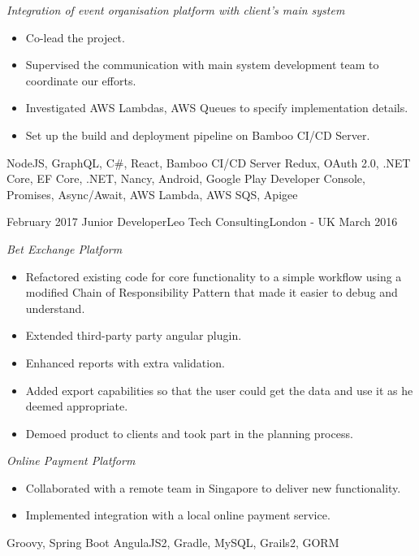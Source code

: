 \begin{experiences}
{        \emph{Integration of event organisation platform with client's main system}
        \begin{itemize}
          \item Co-lead the project.
          \item Supervised the communication with main system development team to coordinate our efforts.
          \item Investigated AWS Lambdas, AWS Queues to specify implementation details.
          \item Set up the build and deployment pipeline on Bamboo CI/CD Server.
        \end{itemize}
      }
      {NodeJS, GraphQL, C\#, React, Bamboo CI/CD Server}
      {Redux, OAuth 2.0, .NET Core, EF Core, .NET, Nancy, Android, Google Play Developer Console, Promises, Async/Await, AWS Lambda, AWS SQS, Apigee}
    \emptySeparator

    \experience
      {February 2017}
      {Junior Developer}{Leo Tech Consulting}{London - UK}
      {March 2016}
      {
        \emph{Bet Exchange Platform}
        \begin{itemize}
          \item Refactored existing code for core functionality to a simple workflow using a modified Chain of Responsibility Pattern that made it easier to debug and understand.
          \item Extended third-party party angular plugin.
          \item Enhanced reports with extra validation.
          \item Added export capabilities so that the user could get the data and use it as he deemed appropriate.
          \item Demoed product to clients and took part in the planning process.
        \end{itemize}

        \emph{Online Payment Platform}
        \begin{itemize}
          \item Collaborated with a remote team in Singapore to deliver new functionality.
          \item Implemented integration with a local online payment service.
        \end{itemize}
      }
      {Groovy, Spring Boot}
      {AngulaJS2, Gradle, MySQL, Grails2, GORM}
    \emptySeparator


\end{experiences}
